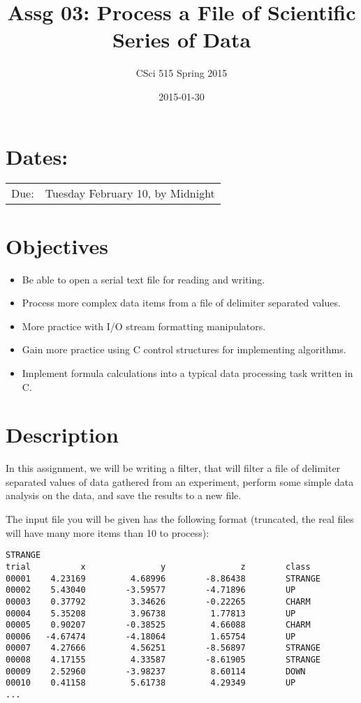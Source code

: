 \documentclass[11pt]{article}
\title{Assg 03: Process a File of Scientific Series of Data}
\author{CSci 515 Spring 2015}
\date{2015-01-30}
\begin{document}
\maketitle


\section*{Dates:}
\label{sec-1}


\begin{center}
\begin{tabular}{ll}
 Due:  &  Tuesday February 10, by Midnight  \\
\end{tabular}
\end{center}
\section*{Objectives}
\label{sec-2}

\begin{itemize}
\item Be able to open a serial text file for reading and writing.
\item Process more complex data items from a file of delimiter separated values.
\item More practice with I/O stream formatting manipulators.
\item Gain more practice using C control structures for implementing
  algorithms.
\item Implement formula calculations into a typical data processing task
  written in C.
\end{itemize}
\section*{Description}
\label{sec-3}

In this assignment, we will be writing a filter, that will filter a file of
delimiter separated values of data gathered from an experiment, perform
some simple data analysis on the data, and save the results to a new file.

The input file you will be given has the following format (truncated,
the real files will have many more items than 10 to process):


\begin{verbatim}
STRANGE
trial          x               y               z        class
00001    4.23169         4.68996        -8.86438        STRANGE
00002    5.43040        -3.59577        -4.71896        UP
00003    0.37792         3.34626        -0.22265        CHARM
00004    5.35208         3.96738         1.77813        UP
00005    0.90207        -0.38525         4.66088        CHARM
00006   -4.67474        -4.18064         1.65754        UP
00007    4.27666         4.56251        -8.56897        STRANGE
00008    4.17155         4.33587        -8.61905        STRANGE
00009    2.52960        -3.98237         8.60114        DOWN
00010    0.41158         5.61738         4.29349        UP
...
\end{verbatim}
\end{document}
